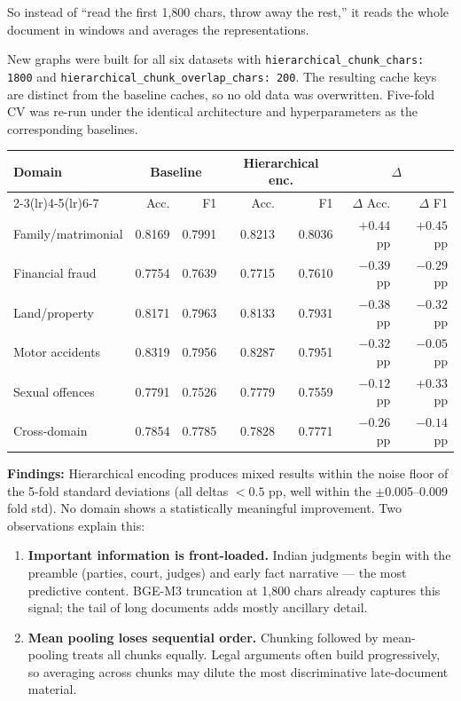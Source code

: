 \documentclass[12pt,a4paper]{article}
\begin{document}
So instead of ``read the first 1{,}800 chars, throw away the rest,'' it reads the whole document in windows and averages the representations.

New graphs were built for all six datasets with \texttt{hierarchical\_chunk\_chars: 1800} and \texttt{hierarchical\_chunk\_overlap\_chars: 200}. The resulting cache keys are distinct from the baseline caches, so no old data was overwritten. Five-fold CV was re-run under the identical architecture and hyperparameters as the corresponding baselines.

\begin{center}
\begin{tabular}{lrrrrrr}
\toprule
\textbf{Domain} & \multicolumn{2}{c}{\textbf{Baseline}} & \multicolumn{2}{c}{\textbf{Hierarchical enc.}} & \multicolumn{2}{c}{\textbf{$\Delta$}} \\
\cmidrule(lr){2-3}\cmidrule(lr){4-5}\cmidrule(lr){6-7}
 & Acc. & F1 & Acc. & F1 & $\Delta$ Acc. & $\Delta$ F1 \\
\midrule
Family/matrimonial & 0.8169 & 0.7991 & 0.8213 & 0.8036 & $+0.44$pp & $+0.45$pp \\
Financial fraud    & 0.7754 & 0.7639 & 0.7715 & 0.7610 & $-0.39$pp & $-0.29$pp \\
Land/property      & 0.8171 & 0.7963 & 0.8133 & 0.7931 & $-0.38$pp & $-0.32$pp \\
Motor accidents    & 0.8319 & 0.7956 & 0.8287 & 0.7951 & $-0.32$pp & $-0.05$pp \\
Sexual offences    & 0.7791 & 0.7526 & 0.7779 & 0.7559 & $-0.12$pp & $+0.33$pp \\
\midrule
Cross-domain       & 0.7854 & 0.7785 & 0.7828 & 0.7771 & $-0.26$pp & $-0.14$pp \\
\bottomrule
\end{tabular}
\end{center}

\textbf{Findings:} Hierarchical encoding produces mixed results within the noise floor of the 5-fold standard deviations (all deltas $<0.5$ pp, well within the $\pm$0.005--0.009 fold std). No domain shows a statistically meaningful improvement. Two observations explain this:

\begin{enumerate}[noitemsep]
  \item \textbf{Important information is front-loaded.} Indian judgments begin with the preamble (parties, court, judges) and early fact narrative — the most predictive content. BGE-M3 truncation at 1{,}800 chars already captures this signal; the tail of long documents adds mostly ancillary detail.
  \item \textbf{Mean pooling loses sequential order.} Chunking followed by mean-pooling treats all chunks equally. Legal arguments often build progressively, so averaging across chunks may dilute the most discriminative late-document material.
\end{enumerate}
\end{document}
